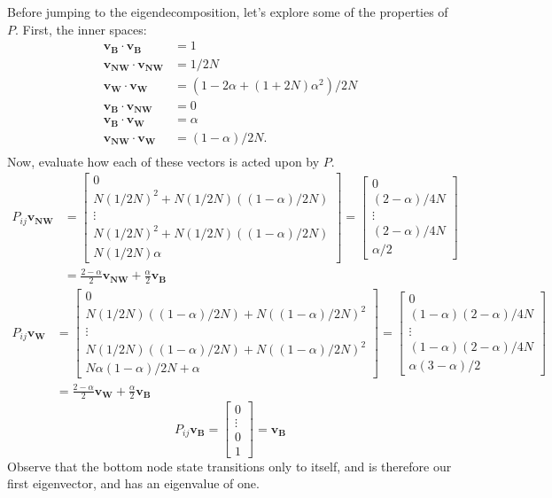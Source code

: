 \documentclass[11pt]{article}
\begin{document}
Before jumping to the eigendecomposition, let's explore some of the properties of $P$. First, the inner spaces:
\begin{align}
\mathbf{v_B}\cdot\mathbf{v_B} &= 1\\
\mathbf{v_{NW}}\cdot\mathbf{v_{NW}} &= 1/2N\\
\mathbf{v_W}\cdot\mathbf{v_W} &= (1 - 2\alpha + (1+2N)\alpha^2)/2N\\
\mathbf{v_B}\cdot\mathbf{v_{NW}} &= 0\\
\mathbf{v_B}\cdot\mathbf{v_W} &= \alpha\\
\mathbf{v_{NW}}\cdot\mathbf{v_W} &= (1-\alpha)/2N.\\
\end{align}
Now, evaluate how each of these vectors is acted upon by $P$.
\begin{align}
P_{ij}\mathbf{v_{NW}} &= \left[\begin{array}{c}
0\\N(1/2N)^2 + N(1/2N)((1-\alpha)/2N)\\\vdots\\N(1/2N)^2 + N(1/2N)((1-\alpha)/2N)\\N(1/2N)\alpha
\end{array}\right] = \left[\begin{array}{c}
0\\(2-\alpha)/4N\\\vdots\\(2-\alpha)/4N\\\alpha/2
\end{array}\right]\\ 
&= \frac{2-\alpha}{2}\mathbf{v_{NW}} + \frac{\alpha}{2}\mathbf{v_B}
\end{align}
\begin{align}
P_{ij}\mathbf{v_{W}} &= \left[\begin{array}{c}
0\\N(1/2N)((1-\alpha)/2N) + N((1-\alpha)/2N)^2\\\vdots\\N(1/2N)((1-\alpha)/2N) + N((1-\alpha)/2N)^2\\N\alpha(1-\alpha)/2N + \alpha
\end{array}\right] = \left[\begin{array}{c}
0\\(1-\alpha)(2-\alpha)/4N\\\vdots\\(1-\alpha)(2-\alpha)/4N\\ \alpha(3-\alpha)/2
\end{array}\right]\\ 
&=\frac{2-\alpha}{2}\mathbf{v_W} + \frac{\alpha}{2}\mathbf{v_B}\label{eq:Pvw}
\end{align}
\begin{equation}\label{eq:Pvb}
P_{ij}\mathbf{v_B} = \left[\begin{array}{c}
0\\\vdots\\0\\1
\end{array}\right] = \mathbf{v_B}
\end{equation}
Observe that the bottom node state transitions only to itself, and is therefore our first eigenvector, and has an eigenvalue of one.
\end{document}
